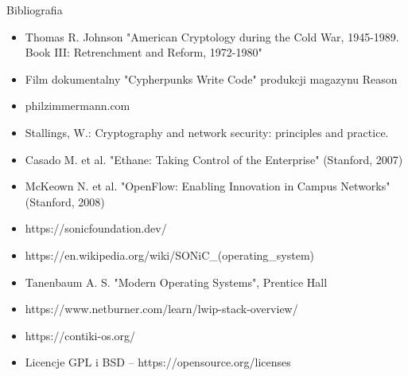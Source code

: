 \documentclass[aspectratio=169]{beamer}
\begin{document}
\begin{frame}{Bibliografia}
    \begin{itemize}
        \item Thomas R. Johnson "American Cryptology during the Cold War, 1945-1989. Book III: Retrenchment and Reform, 1972-1980"
        \item Film dokumentalny "Cypherpunks Write Code" produkcji magazynu Reason
        \item philzimmermann.com
        \item Stallings, W.: Cryptography and network security: principles and practice.
        \item Casado M. et al. "Ethane: Taking Control of the Enterprise" (Stanford, 2007)
        \item McKeown N. et al. "OpenFlow: Enabling Innovation in Campus Networks" (Stanford, 2008)
        \item https://sonicfoundation.dev/
        \item https://en.wikipedia.org/wiki/SONiC\_(operating\_system)
        \item Tanenbaum A. S. "Modern Operating Systems", Prentice Hall
        \item https://www.netburner.com/learn/lwip-stack-overview/
        \item https://contiki-os.org/
        \item Licencje GPL i BSD – https://opensource.org/licenses
    \end{itemize}
\end{frame}

\pglastframe

\end{document}
